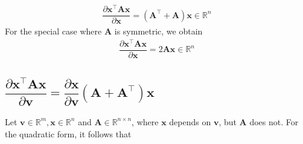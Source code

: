 \documentclass{article}
\newcommand{\trans}{\top}
\begin{document}
\begin{align}
    \label{eq:quadratic-solution}
    \boxed{\dfrac{\partial \mathbf{x}^\trans \mathbf{A} \mathbf{x}}{\partial \mathbf{x}} = \left(\mathbf{A}^\trans + \mathbf{A}\right) \mathbf{x} \in \mathbb{R}^{n}}
\end{align}
For the special case where \(\mathbf{A}\) is symmetric, we obtain
\begin{align}
    \boxed{\dfrac{\partial \mathbf{x}^\trans \mathbf{A} \mathbf{x}}{\partial \mathbf{x}} = 2\mathbf{A} \mathbf{x} \in \mathbb{R}^{n}}
\end{align}

\subsection{\(\dfrac{\partial \mathbf{x}^\trans \mathbf{A} \mathbf{x}}{\partial \mathbf{v}} = \dfrac{\partial \mathbf{x}}{\partial \mathbf{v}}\left( \mathbf{A} + \mathbf{A}^\trans \right) \mathbf{x}\)}
Let \(\mathbf{v} \in \mathbb{R}^{m}, \mathbf{x} \in \mathbb{R}^{n}\) and \(\mathbf{A}\in \mathbb{R}^{n\times n}\), where \(\mathbf{x}\) depends on \(\mathbf{v}\), but \(\mathbf{A}\) does not. For the quadratic form, it follows that
\end{document}
